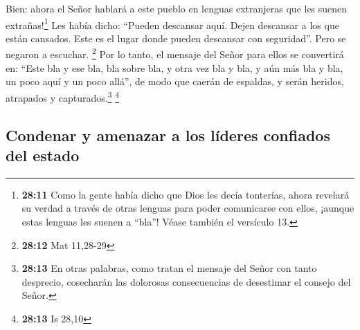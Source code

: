  Bien: ahora el Señor hablará a este pueblo en lenguas
extranjeras que les suenen extrañas!\footnote{\textbf{28:11} Como la
  gente había dicho que Dios les decía tonterías, ahora revelará su
  verdad a través de otras lenguas para poder comunicarse con ellos,
  ¡aunque estas lenguas les suenen a ``bla''! Véase también el versículo
  13.}  Les había dicho: ``Pueden descansar aquí. Dejen
descansar a los que están cansados. Este es el lugar donde pueden
descansar con seguridad''. Pero se negaron a escuchar. \footnote{\textbf{28:12}
  Mat 11,28-29}  Por lo tanto, el mensaje del Señor para
ellos se convertirá en: ``Este bla y ese bla, bla sobre bla, y otra vez
bla y bla, y aún más bla y bla, un poco aquí y un poco allá'', de modo
que caerán de espaldas, y serán heridos, atrapados y
capturados.\footnote{\textbf{28:13} En otras palabras, como tratan el
  mensaje del Señor con tanto desprecio, cosecharán las dolorosas
  consecuencias de desestimar el consejo del Señor.} \footnote{\textbf{28:13}
  Is 28,10}

\hypertarget{condenar-y-amenazar-a-los-luxedderes-confiados-del-estado}{%
\subsection{Condenar y amenazar a los líderes confiados del
estado}\label{condenar-y-amenazar-a-los-luxedderes-confiados-del-estado}}

